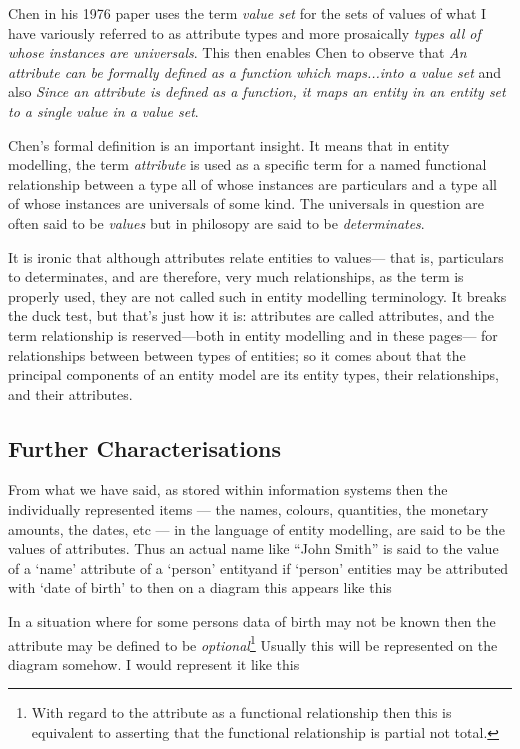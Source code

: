 \mynote
Chen in his  1976 paper uses the term \textit{value set} for the sets of values of what I have variously
referred to as attribute types and more prosaically \textit{types all of whose instances are universals}.
This then enables Chen to observe that \textit{An attribute can be formally defined as a function which maps...into a value set} and also \textit{Since an attribute is defined as a function, it maps an entity in an entity
set to a single value in a value set}.

\mynote
Chen's formal definition is an important insight.
It means that in entity modelling, the term \textit{attribute} is used as a specific term
for a named functional relationship between a type all of whose instances are particulars  and a type all of whose instances are universals of some kind.
The universals in question are often said to be \textit{values} but 
in philosopy  are said to be \textit{determinates}. 

\mynote
It is ironic that although attributes relate entities to values—
that is, particulars to determinates, and are therefore, very much relationships, as the term is properly used, 
they are not called such in entity modelling terminology.
It breaks the duck test, but that’s just how it is:
attributes are called attributes,
and the term relationship is reserved---both in entity modelling and in these pages---
for relationships between between types of entities;
so it comes about that the principal components of an entity model are its entity types,
their relationships, and their attributes.

\subsection{Further Characterisations}
\mynote  From what we have said, as stored within information systems
then the individually represented items --- the 
names, colours, quantities, the monetary amounts, the dates, etc --- in the language 
of entity modelling, are said to be the values of attributes. Thus an actual name 
like ``John Smith'' is said to the value of a ‘name’ attribute of a ‘person’ entityand if 
`person' entities may be attributed with ‘date of birth’ to
then on a diagram this appears like this

\mynote 
In a situation where for some persons data of birth may not be known then the attribute
may be defined to be \textit{optional}\footnote{With regard to the attribute as a functional relationship
then this is equivalent to asserting that the functional relationship is partial not total.}
Usually this will be represented on the diagram somehow. I would represent it like this

